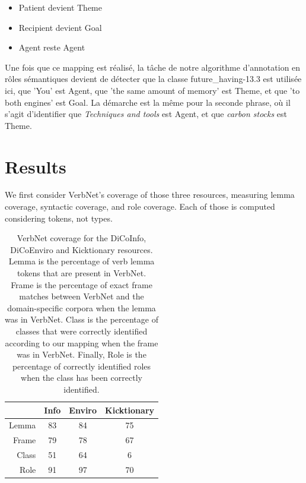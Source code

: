 \begin{itemize}
    \item Patient devient Theme
    \item Recipient devient Goal
    \item Agent reste Agent
\end{itemize}

Une fois que ce mapping est réalisé, la tâche de notre algorithme d'annotation
en rôles sémantiques devient de détecter que la classe future\_having-13.3 est
utilisée ici, que 'You' est Agent, que 'the same amount of memory' est Theme,
et que 'to both engines' est Goal. La démarche est la même pour la seconde
phrase, où il s'agit d'identifier que \textit{Techniques and tools} est Agent,
et que \textit{carbon stocks} est Theme.


\section{Results}
\label{sec:domainsrlresults}

We first consider VerbNet's coverage of those three resources, measuring lemma
coverage, syntactic coverage, and role coverage. Each of those is computed
considering tokens, not types.

\begin{table}[h]
\centering
\begin{tabular}{rccc}
  \toprule
        & Info & Enviro & Kicktionary \\
  \midrule
  Lemma & 83 & 84 & 75 \\
  Frame & 79 & 78 & 67 \\
  Class & 51 & 64 & 6  \\
  Role  & 91 & 97 & 70 \\
  \bottomrule
\end{tabular}

\caption{\protect\label{table:coverage} VerbNet coverage for the DiCoInfo,
DiCoEnviro and Kicktionary resources. Lemma is the percentage of verb lemma
tokens that are present in VerbNet. Frame is the percentage of exact frame
matches between VerbNet and the domain-specific corpora when the lemma was in
VerbNet. Class is the percentage of classes that were correctly identified
according to our mapping when the frame was in VerbNet. Finally, Role is the
percentage of correctly identified roles when the class has been correctly
identified.}

\end{table}

